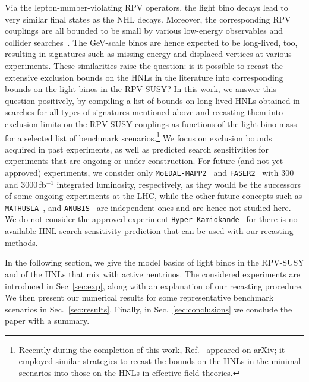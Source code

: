 Via the lepton-number-violating RPV operators, the light bino decays lead to very similar final states as the NHL 
decays.
Moreover, the corresponding RPV couplings are all bounded to be small by various low-energy observables and
collider searches~\cite{Barbier:2004ez, Allanach:1999ic, Bolton:2021hje, Bansal:2018dge, Bansal:2019zak}. The GeV-scale
binos are hence expected to be long-lived, too, resulting in signatures such as missing energy and displaced vertices at various experiments.
These similarities raise the question: is it possible to recast the extensive exclusion bounds 
on the HNLs in the literature into corresponding bounds on the light binos in the RPV-SUSY?
In this work, we answer this question positively, by compiling a list of bounds on long-lived HNLs obtained in searches for all types of signatures 
mentioned above and recasting them into exclusion limits on the RPV-SUSY couplings as functions of the light bino mass for 
a selected list of benchmark scenarios.\footnote{Recently during the completion of this work, Ref.~\cite{Fernandez-Martinez:2023phj} appeared on arXiv; it employed similar strategies to recast the bounds on the HNLs in the minimal scenarios into those on the HNLs in effective field 
theories.} We focus on exclusion bounds acquired in past experiments, as well as predicted search sensitivities for experiments that are ongoing 
or under construction. For future (and not yet approved) experiments, we consider only 
\texttt{MoEDAL-MAPP2}~\cite{Pinfold:2019nqj, Pinfold:2019zwp} and \texttt{FASER2}~\cite{FASER:2018eoc} with 300 and 
3000\,fb$^{-1}$ integrated luminosity, respectively, as they would be the successors of some ongoing experiments at the 
LHC, while the other future concepts such as \texttt{MATHUSLA}~\cite{Curtin:2018mvb, Chou:2016lxi, MATHUSLA:2020uve}, and \texttt{ANUBIS}~\cite{Bauer:2019vqk} are independent ones and are hence not studied here. We do not consider the approved experiment \texttt{Hyper-Kamiokande}~\cite{Abe:2011ts, Hyper-KamiokandeWorkingGroup:2013hcb} for there is no 
available HNL-search sensitivity prediction that can be used with our recasting methods. 





In the following section, we give the model basics of light binos in the RPV-SUSY and of the HNLs that mix with active neutrinos.
The considered experiments are introduced in Sec~\ref{sec:exp}, along with an explanation of our recasting procedure.
We then present our numerical results for some representative benchmark scenarios in Sec.~\ref{sec:results}.
Finally, in Sec.~\ref{sec:conclusions} we conclude the paper with a summary.




